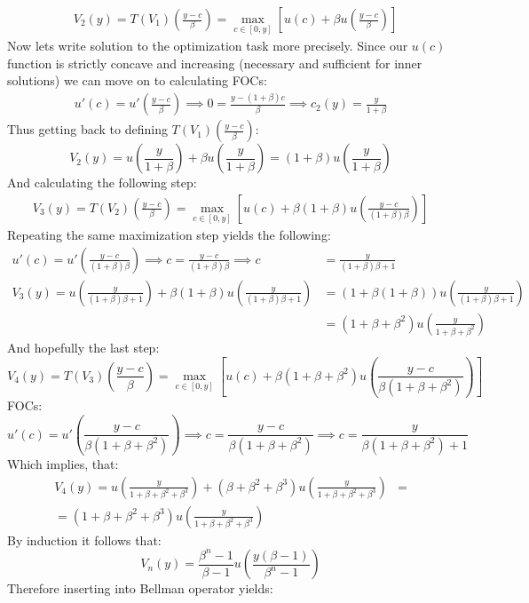 \documentclass[11pt, oneside]{article}
\renewcommand{\b}{\beta}
\begin{document}
\begin{enumerate}[(a)]
\begin{align*}
	&V_{2}(y) = T(V_{1})\left(\frac{y-c}{\b}\right) = \max_{c\in [0, y]} \left[ u(c) + \b u\left(\frac{y-c}{\b}\right)\right]
\end{align*}
Now lets write solution to the optimization task more precisely. Since our $ u(c) $ function is strictly concave and increasing (necessary and sufficient for inner solutions) we can move on to calculating FOCs:
\begin{align}
	u'(c) = u'\left(\frac{y-c}{\b}\right) \implies 0 = \frac{y-(1 + \b)c }{\beta} \implies c_{2}(y)= \frac{y}{1+\b}
\end{align}
Thus getting back to defining $ T(V_{1})\left( \frac{y-c}{\b} \right) $:
\[
V_{2}(y) = u\left( \frac{y}{1+\b} \right) + \b u \left(\frac{y}{1+\b} \right) = (1+ \b) u \left(\frac{y}{1+\b}\right)
\]
And calculating the following step:
\begin{align*}
	V_{3}(y) = T(V_{2}) \left(\frac{y-c}{\b}\right) = \max_{c\in [0, y]} \left[ u(c) + \b(1+ \b) u\left(\frac{y-c}{(1+\b)\b}\right)\right]
\end{align*}
Repeating the same maximization step yields the following:
\begin{align*}
	u'(c) = u'\left( \frac{y-c}{(1+\b)\b} \right) \implies c = \frac{y-c}{(1+\b)\b} \implies c &= \frac{y}{(1+\b)\b + 1} \\ V_{3}(y) = u\left(\frac{y}{(1+\b)\b + 1}\right) + \b(1+\b)u\left(\frac{y}{(1+\b)\b + 1}\right) &= (1 + \b(1+\b))u\left(\frac{y}{(1+\b)\b + 1}\right) \\
	&= (1 + \b + \b^{2})u\left(\frac{y}{1+\b + \b^{2}}\right)
\end{align*}
	And hopefully the last step:
	\[
	V_{4}(y) = T(V_{3})\left(\frac{y-c}{\b}\right) = \max_{c\in[0, y]} \left[ u(c) + \b (1+\b + \b^{2}) u \left(\frac{y-c}{\b(1+\b + \b^{2})}\right)\right]
	\]
	FOCs:
	\[
	u'(c) = u'\left(\frac{y-c}{\b(1+\b + \b^{2})}\right) \implies c = \frac{y-c}{\b(1+\b+\b^{2})} \implies c = \frac{y}{\b(1 + \b + \b^{2}) + 1}
	\]
	Which implies, that:
	\begin{align*}
	V_{4}(y) = u\left(\frac{y}{1 + \b + \b^{2} + \b^{3}}\right) + (\b + \b^{2} + \b^{3})u\left( \frac{y}{1 + \b + \b^{2} + \b^{3}} \right) &= \\
	= (1 + \b + \b^{2} + \b^{3})u\left(\frac{y}{1+\b+\b^{2} + \b^{3}}\right)&
	\end{align*}
By induction it follows that:
\[
V_{n}(y) = \frac{\b^{n} - 1}{\b - 1} u \left(\frac{y(\b - 1)}{\b^{n} - 1}\right)
\]
Therefore inserting into Bellman operator yields:
\begin{gather*}

\end{gather*}
\end{enumerate}
\end{document}
